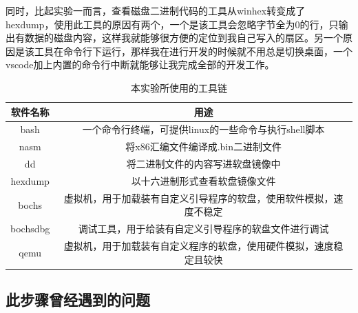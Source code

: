 \documentclass[forprint]{WHUBachelor}
\begin{document}
同时，比起实验一而言，查看磁盘二进制代码的工具从winhex转变成了hexdump，使用此工具的原因有两个，一个是该工具会忽略字节全为0的行，只输出有数据的磁盘内容，这样我就能够很方便的定位到我自己写入的扇区。另一个原因是该工具在命令行下运行，那样我在进行开发的时候就不用总是切换桌面，一个vscode加上内置的命令行中断就能够让我完成全部的开发工作。

\begin{table}[htp]
  \caption{本实验所使用的工具链}
  \centering
  \begin{tabular}{cc}
    \toprule
    软件名称 & 用途  \\
    \midrule
    bash & 一个命令行终端，可提供linux的一些命令与执行shell脚本 \\
    nasm & 将x86汇编文件编译成.bin二进制文件 \\
    dd & 将二进制文件的内容写进软盘镜像中  \\
    hexdump & 以十六进制形式查看软盘镜像文件 \\
    bochs & 虚拟机，用于加载装有自定义引导程序的软盘，使用软件模拟，速度不稳定  \\
    bochsdbg & 调试工具，用于给装有自定义引导程序的软盘文件进行调试 \\
    qemu & 虚拟机，用于加载装有自定义程序的软盘，使用硬件模拟，速度稳定且较快 \\
    \bottomrule
  \end{tabular}
  \label{tab:tools}
\end{table}

\subsection{此步骤曾经遇到的问题}
\end{document}

